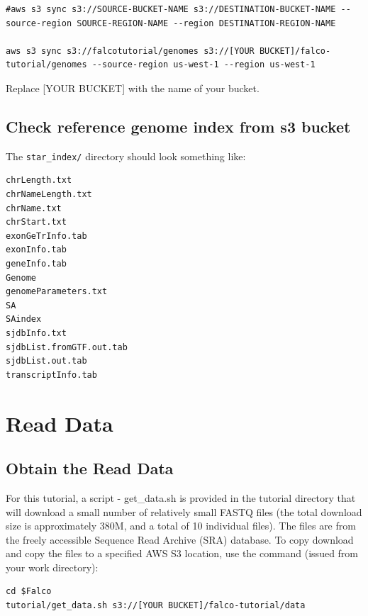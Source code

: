 \documentclass[
]{book}
\begin{document}
\begin{verbatim}
#aws s3 sync s3://SOURCE-BUCKET-NAME s3://DESTINATION-BUCKET-NAME --source-region SOURCE-REGION-NAME --region DESTINATION-REGION-NAME

aws s3 sync s3://falcotutorial/genomes s3://[YOUR BUCKET]/falco-tutorial/genomes --source-region us-west-1 --region us-west-1
\end{verbatim}

Replace {[}YOUR BUCKET{]} with the name of your bucket.

\hypertarget{check-reference-genome-index-from-s3-bucket}{%
\section{Check reference genome index from s3 bucket}\label{check-reference-genome-index-from-s3-bucket}}

The \texttt{star\_index/} directory should look something like:

\begin{verbatim}
chrLength.txt
chrNameLength.txt
chrName.txt
chrStart.txt
exonGeTrInfo.tab
exonInfo.tab
geneInfo.tab
Genome
genomeParameters.txt
SA
SAindex
sjdbInfo.txt
sjdbList.fromGTF.out.tab
sjdbList.out.tab
transcriptInfo.tab
\end{verbatim}

\hypertarget{read-data}{%
\chapter{Read Data}\label{read-data}}

\hypertarget{obtain-the-read-data}{%
\section{Obtain the Read Data}\label{obtain-the-read-data}}

For this tutorial, a script - get\_data.sh is provided in the tutorial directory that will download a small number of relatively small FASTQ files (the total download size is approximately 380M, and a total of 10 individual files). The files are from the freely accessible Sequence Read Archive (SRA) database. To copy download and copy the files to a specified AWS S3 location, use the command (issued from your work directory):

\begin{verbatim}
cd $Falco
tutorial/get_data.sh s3://[YOUR BUCKET]/falco-tutorial/data
\end{verbatim}
\end{document}
